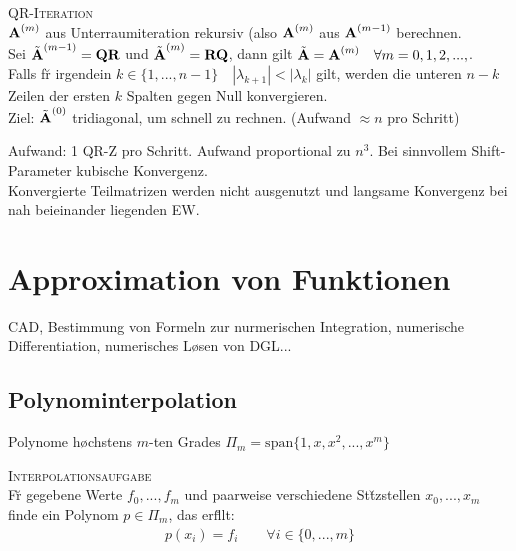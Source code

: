 \textsc{QR-Iteration}\\
$\mbox{\bf A}^{(m)}$ aus Unterraumiteration rekursiv (also $\mbox{\bf A}^{(m)}$ aus $\mbox{\bf A}^{(m-1)}$ berechnen.\\
Sei $\tilde{\mbox{\bf A}}^{(m-1)} = \mbox{\bf QR}$ und $\tilde{\mbox{\bf A}}^{(m)} = \mbox{\bf RQ}$, dann gilt $\tilde{\mbox{\bf A}}=\mbox{\bf A}^{(m)} \quad \forall m=0,1,2,...,$.\\ 
Falls f\u r irgendein $k \in \{1,...,n-1\} \quad |\lambda_{k+1}|<|\lambda_k|$ gilt, werden die unteren $n-k$ Zeilen der ersten $k$ Spalten gegen Null konvergieren.\\
Ziel: $\tilde{\mbox{\bf A}}^{(0)}$ tridiagonal, um schnell zu rechnen. (Aufwand $\approx n$ pro Schritt)
\vspace{0.2cm}

Aufwand: 1 QR-Z pro Schritt. Aufwand proportional zu $n^3$. Bei sinnvollem Shift-Parameter kubische Konvergenz.\\
Konvergierte Teilmatrizen werden nicht ausgenutzt und langsame Konvergenz bei nah beieinander liegenden EW.



\section{Approximation von Funktionen}
CAD, Bestimmung von Formeln zur nurmerischen Integration, numerische Differentiation, numerisches L\o sen von DGL...

\subsection{Polynominterpolation}
Polynome h\o chstens $m$-ten Grades $\Pi_m = \text{span}\{1,x,x^2,...,x^m\}$

\textsc{Interpolationsaufgabe}\\
F\u r gegebene Werte $f_0, ..., f_m$ und paarweise verschiedene St\u tzstellen $x_0, ..., x_m$ finde ein Polynom $p \in \Pi_m$, das erf\u llt:
\begin{align*}
p(x_i)=f_i \qquad \forall i\in \{0,...,m\}
\end{align*}\vspace{0.2cm}

